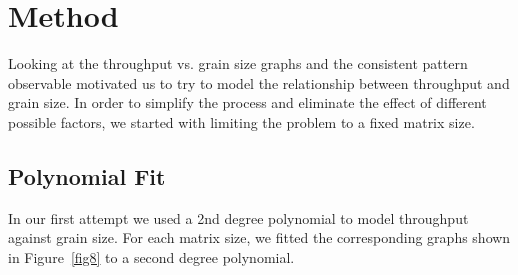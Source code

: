 \vspace{\baselineskip}	
\section{Method}
Looking at the throughput vs. grain size graphs and the consistent pattern observable motivated us to try to model the relationship between throughput and grain size. 
In order to simplify the process and eliminate the effect of different possible factors, we started with limiting the problem to a fixed matrix size. 

\vspace{\baselineskip}	
\subsection{Polynomial Fit}
In our first attempt we used a 2nd degree polynomial to model throughput against grain size. For each matrix size, we fitted the corresponding graphs shown in Figure~\ref{fig8} to a second degree polynomial. 

